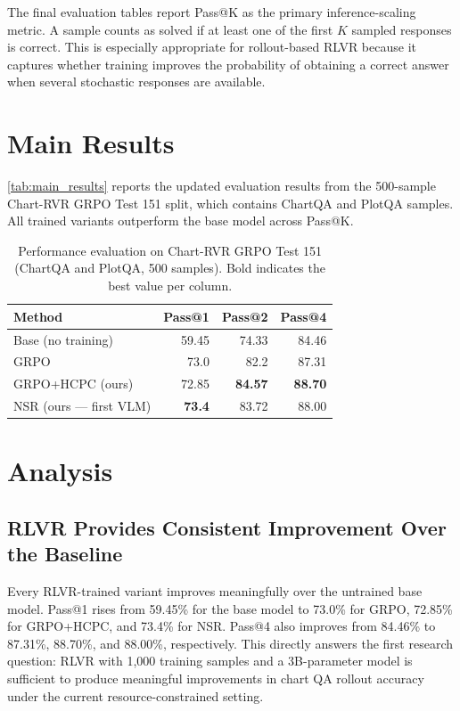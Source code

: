 \documentclass{iutbscthesis}
\begin{document}
The final evaluation tables report Pass@K as the primary inference-scaling metric. A sample counts as solved if at least one of the first $K$ sampled responses is correct. This is especially appropriate for rollout-based RLVR because it captures whether training improves the probability of obtaining a correct answer when several stochastic responses are available.

\section{Main Results}

\autoref{tab:main_results} reports the updated evaluation results from the 500-sample Chart-RVR GRPO Test 151 split, which contains ChartQA and PlotQA samples. All trained variants outperform the base model across Pass@K.

\begin{table}[H]
    \centering
    \small
    \begin{tabular}{lrrr}
        \toprule
        Method & Pass@1 & Pass@2 & Pass@4 \\
        \midrule
        Base (no training) & 59.45 & 74.33 & 84.46 \\
        GRPO & 73.0 & 82.2 & 87.31 \\
        GRPO+HCPC (ours) & 72.85 & \textbf{84.57} & \textbf{88.70} \\
        NSR (ours --- first VLM) & \textbf{73.4} & 83.72 & 88.00 \\
        \bottomrule
    \end{tabular}
    \caption{Performance evaluation on Chart-RVR GRPO Test 151 (ChartQA and PlotQA, 500 samples). Bold indicates the best value per column.}
    \label{tab:main_results}
\end{table}

\section{Analysis}

\subsection{RLVR Provides Consistent Improvement Over the Baseline}

Every RLVR-trained variant improves meaningfully over the untrained base model. Pass@1 rises from 59.45\% for the base model to 73.0\% for GRPO, 72.85\% for GRPO+HCPC, and 73.4\% for NSR. Pass@4 also improves from 84.46\% to 87.31\%, 88.70\%, and 88.00\%, respectively. This directly answers the first research question: RLVR with 1,000 training samples and a 3B-parameter model is sufficient to produce meaningful improvements in chart QA rollout accuracy under the current resource-constrained setting.
\end{document}

